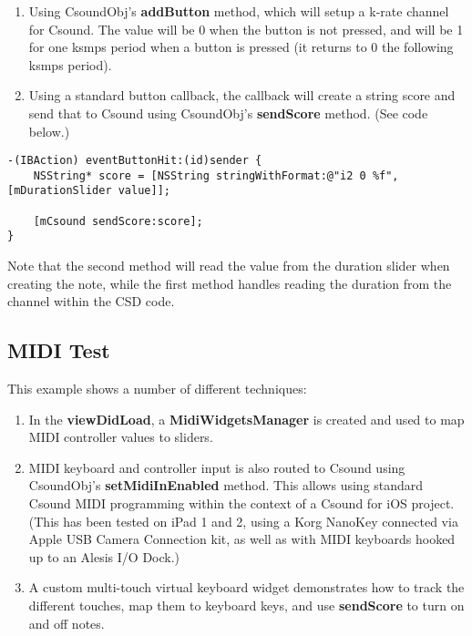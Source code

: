 \documentclass[11pt]{article}
\begin{document}
\begin{enumerate}
\item Using CsoundObj's \textbf{addButton} method, which will setup a k-rate channel for Csound.  The value will be 0 when the button is not pressed, and will be 1 for one ksmps period when a button is pressed (it returns to 0 the following ksmps period). 
\item Using a standard button callback, the callback will create a string score and send that to Csound using CsoundObj's \textbf{sendScore} method. (See code below.)
\end{enumerate}


\begin{lstlisting}[caption=Example code showing sending score text to CsoundObj]
-(IBAction) eventButtonHit:(id)sender {
    NSString* score = [NSString stringWithFormat:@"i2 0 %f", [mDurationSlider value]];

    [mCsound sendScore:score];
}
\end{lstlisting}

Note that the second method will read the value from the duration slider when creating the note, while the first method handles reading the duration from the channel within the CSD code. 

\subsection{MIDI Test}

This example shows a number of different techniques:

\begin{enumerate}
\item In the \textbf{viewDidLoad}, a \textbf{MidiWidgetsManager} is created and used to map MIDI controller values to sliders.
\item MIDI keyboard and controller input is also routed to Csound using CsoundObj's \textbf{setMidiInEnabled} method. This allows using standard Csound MIDI programming within the context of a Csound for iOS project. (This has been tested on iPad 1 and 2, using a Korg NanoKey connected via Apple USB Camera Connection kit, as well as with MIDI keyboards hooked up to an Alesis I/O Dock.) 
\item A custom multi-touch virtual keyboard widget demonstrates how to track the different touches, map them to keyboard keys, and use \textbf{sendScore} to turn on and off notes. 
\end{enumerate}
\end{document}
